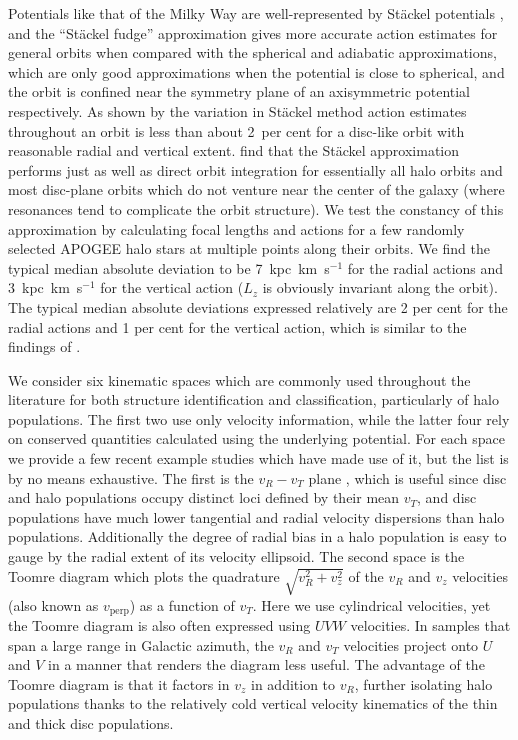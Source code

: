 Potentials like that of the Milky Way are well-represented by St\"{a}ckel potentials \parencite{dejonghe88}, and the ``St\"{a}ckel fudge'' approximation gives more accurate action estimates for general orbits when compared with the spherical and adiabatic approximations, which are only good approximations when the potential is close to spherical, and the orbit is confined near the symmetry plane of an axisymmetric potential respectively. As shown by \parencite{bovy15} the variation in St\"{a}ckel method action estimates throughout an orbit is less than about 2~per cent for a disc-like orbit with reasonable radial and vertical extent. \textcite{mackereth18c} find that the St\"{a}ckel approximation performs just as well as direct orbit integration for essentially all halo orbits and most disc-plane orbits which do not venture near the center of the galaxy (where resonances tend to complicate the orbit structure). We test the constancy of this approximation by calculating focal lengths and actions for a few randomly selected APOGEE halo stars at multiple points along their orbits. We find the typical median absolute deviation to be 7~kpc~km~s$^{-1}$ for the radial actions and 3~kpc~km~s$^{-1}$ for the vertical action ($L_{z}$ is obviously invariant along the orbit). The typical median absolute deviations expressed relatively are 2 per cent for the radial actions and 1 per cent for the vertical action, which is similar to the findings of \textcite{bovy15}.

We consider six kinematic spaces which are commonly used throughout the literature for both structure identification and classification, particularly of halo populations. The first two use only velocity information, while the latter four rely on conserved quantities calculated using the underlying potential. For each space we provide a few recent example studies which have made use of it, but the list is by no means exhaustive. The first is the $v_{R}-v_{T}$ plane \parencite[e.g. ][]{belokurov18, fattahi19,lancaster19,mackereth19a,belokurov20, feuillet20}, which is useful since disc and halo populations occupy distinct loci defined by their mean $v_{T}$, and disc populations have much lower tangential and radial velocity dispersions than halo populations. Additionally the degree of radial bias in a halo population is easy to gauge by the radial extent of its velocity ellipsoid. The second space is the Toomre diagram \parencite[e.g. ][]{hawkins15,helmi18,koppelman19b,feuillet20,cordoni20} which plots the quadrature $\sqrt{v_R^2+v_z^2}$ of the $v_{R}$ and $v_{z}$ velocities (also known as $v_\mathrm{perp}$) as a function of $v_{T}$. Here we use cylindrical velocities, yet the Toomre diagram is also often expressed using $UVW$ velocities. In samples that span a large range in Galactic azimuth, the $v_R$ and $v_T$ velocities project onto $U$ and $V$ in a manner that renders the diagram less useful. The advantage of the Toomre diagram is that it factors in $v_{z}$ in addition to $v_{R}$, further isolating halo populations thanks to the relatively cold vertical velocity kinematics of the thin and thick disc populations.


